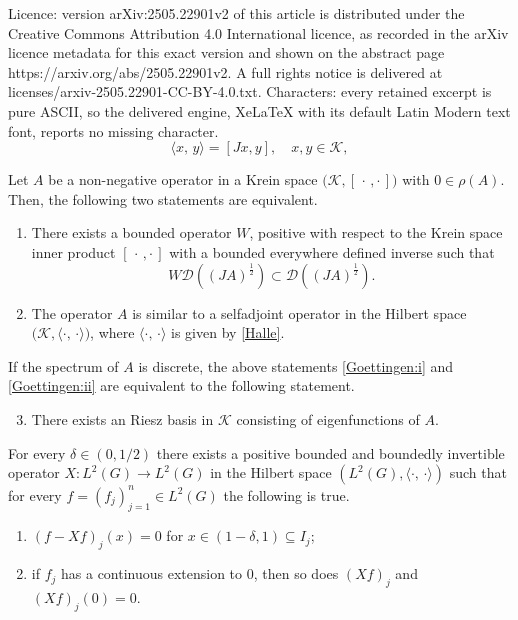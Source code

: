 \documentclass[10pt,a4paper]{amsart}
\newcommand{\cK}{{\mathcal K}}
\newcommand{\kip}{[\,\cdot\, , \cdot\,]}
\newcommand{\mD}{\mathcal{D}}
\newcommand{\scalar}[2]{\langle#1,\, #2\rangle}
\begin{document}
Licence: version arXiv:2505.22901v2 of this article is distributed under the Creative Commons Attribution 4.0 International licence, as recorded in the arXiv licence metadata for this exact version and shown on the abstract page https://arxiv.org/abs/2505.22901v2. A full rights notice is delivered at licenses/arxiv-2505.22901-CC-BY-4.0.txt. Characters: every retained excerpt is pure ASCII, so the delivered engine, XeLaTeX with its default Latin Modern text font, reports no missing character.
\begin{equation}
\label{Halle}
	\scalar{x}{y} = [Jx,y], \quad  x,y \in \cK,
\end{equation}

\begin{theorem}
\label{Goettingen}
Let $A$ be a non-negative operator in a Krein space $\bigl(\cK,\kip\bigr)$ with $0\in\rho(A)$. Then, the following two statements are equivalent.

\begin{enumerate}[label={\upshape(\roman*)}]
    \item\label{Goettingen:i}
    There exists a bounded operator $W$, positive with respect to the Krein space inner product $\kip$ with a bounded everywhere defined inverse such that
    \begin{equation*}
	W\mD\left((JA)^{\frac{1}{2}}\right)\subset \mD\left((JA)^{\frac{1}{2}}\right). 
    \end{equation*}
		
    \item\label{Goettingen:ii}
    The operator $A$ is similar to a selfadjoint operator in the Hilbert space $\bigl(\cK,\scalar{\cdot}{\cdot}\bigr)$, where $\scalar{\cdot}{\cdot}$ is given by \eqref{Halle}.
\end{enumerate}
If the spectrum of $A$ is discrete, the above statements \ref{Goettingen:i} and \ref{Goettingen:ii} are equivalent to the following statement.
\begin{enumerate}[label={\upshape(\roman*)}]
\setcounter{enumi}{2}
    \item\label{Goettingen:iii}
    There exists an Riesz basis in $\cK$ consisting of eigenfunctions of $A$.
\end{enumerate}
\end{theorem}

\begin{lemma}
\label{lemma:invertible_operator}
   For every $\delta\in (0, 1/2)$ there exists a positive bounded and boundedly invertible operator $X: L^2(G)\to L^2(G)$ in the Hilbert space $(L^2(G),\scalar{\cdot}{\cdot})$ such that
   for every $f = (f_j)_{j=1}^n\in L^2(G)$ the following is true.
   \begin{enumerate}[label={(\roman*)}]
	\item\label{item:Xi} 
    $(f-Xf)_j(x) = 0$ for $x \in(1-\delta, 1)\subseteq I_j$;
    
	\item\label{item:Xii} 
        if $f_j$ has a continuous extension to $0$, then so does $(Xf)_j$ and $(Xf)_j(0) = 0$.
   \end{enumerate}
\end{lemma}
\end{document}
